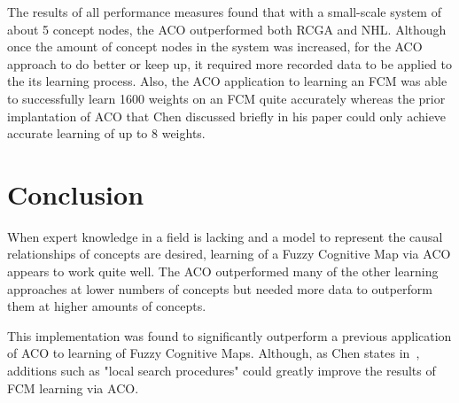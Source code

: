 \documentclass{umm-senior-sem}
\begin{document}
The results of all performance measures found that with a small-scale system of about 5 concept nodes, the ACO outperformed both RCGA and NHL. Although once the amount of concept nodes in the system was increased, for the ACO approach to do better or keep up, it required more recorded data to be applied to the its learning process. Also, the ACO application to learning an FCM was able to successfully learn 1600 weights on an FCM quite accurately whereas the prior implantation of ACO that Chen discussed briefly in his paper could only achieve accurate learning of up to 8 weights.
\section{Conclusion}
\label{sec:Conclusion}
When expert knowledge in a field is lacking and a model to represent the causal relationships of concepts are desired, learning of a Fuzzy Cognitive Map via ACO appears to work quite well. The ACO outperformed many of the other learning approaches at lower numbers of concepts but needed more data to outperform them at higher amounts of concepts. 

This implementation was found to significantly outperform a previous application of ACO to learning of Fuzzy Cognitive Maps. Although, as Chen states in~\cite{main:2012}, additions such as "local search procedures" could greatly improve the results of FCM learning via ACO.

\nocite{*}



\end{document}
